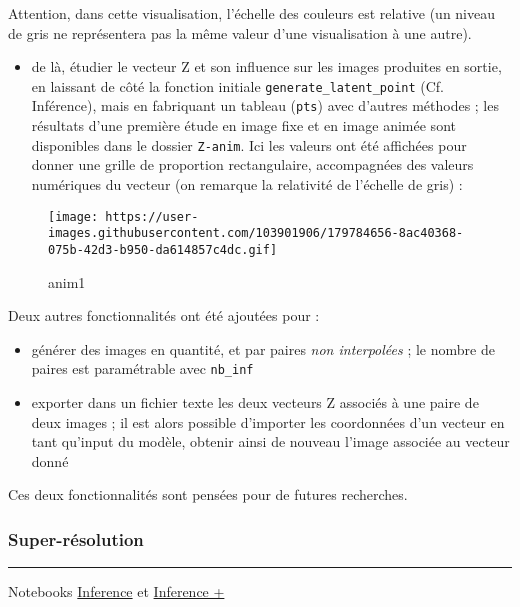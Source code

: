 \documentclass[
]{article}
\providecommand{\tightlist}{%
  \setlength{\itemsep}{0pt}\setlength{\parskip}{0pt}}
\begin{document}
Attention, dans cette visualisation, l'échelle des couleurs est relative (un niveau de gris ne représentera pas la même valeur d'une visualisation à une autre).

\begin{itemize}
\tightlist
\item
  de là, étudier le vecteur Z et son influence sur les images produites en sortie, en laissant de côté la fonction initiale \texttt{generate\_latent\_point} (Cf. Inférence), mais en fabriquant un tableau (\texttt{pts}) avec d'autres méthodes ; les résultats d'une première étude en image fixe et en image animée sont disponibles dans le dossier \texttt{Z-anim}. Ici les valeurs ont été affichées pour donner une grille de proportion rectangulaire, accompagnées des valeurs numériques du vecteur (on remarque la relativité de l'échelle de gris) :
\end{itemize}

\begin{figure}
\centering
\texttt{[image: https://user-images.githubusercontent.com/103901906/179784656-8ac40368-075b-42d3-b950-da614857c4dc.gif]}
\caption{anim1}
\end{figure}

Deux autres fonctionnalités ont été ajoutées pour :

\begin{itemize}
\tightlist
\item
  générer des images en quantité, et par paires \emph{non interpolées} ; le nombre de paires est paramétrable avec \texttt{nb\_inf}
\item
  exporter dans un fichier texte les deux vecteurs Z associés à une paire de deux images ; il est alors possible d'importer les coordonnées d'un vecteur en tant qu'input du modèle, obtenir ainsi de nouveau l'image associée au vecteur donné
\end{itemize}

Ces deux fonctionnalités sont pensées pour de futures recherches.

\hypertarget{super-ruxe9solution}{%
\subsubsection{Super-résolution}\label{super-ruxe9solution}}

\begin{center}\rule{0.5\linewidth}{0.5pt}\end{center}

Notebooks \href{https://colab.research.google.com/drive/13g3rX2zgyxT5YKTZILBrISybmLJ4_pXi}{Inference} et \href{https://colab.research.google.com/drive/13g3rX2zgyxT5YKTZILBrISybmLJ4_pXi}{Inference +}
\end{document}

